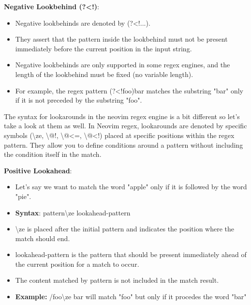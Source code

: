 \documentclass{report}
\begin{document}
    \bigbreak \noindent 
    \textbf{Negative Lookbehind (?<!)}:
    \begin{itemize}
        \item Negative lookbehinds are denoted by (?<!...).
        \item They assert that the pattern inside the lookbehind must not be present immediately before the current position in the input string.
        \item Negative lookbehinds are only supported in some regex engines, and the length of the lookbehind must be fixed (no variable length).
        \item For example, the regex pattern (?<!foo)bar matches the substring "bar" only if it is not preceded by the substring "foo".
    \end{itemize}

    \bigbreak \noindent 

    \pagebreak \bigbreak \noindent
    \bigbreak \noindent 
    The syntax for lookarounds in the neovim regex engine is a bit different so let's take a look at them as well.
    \bigbreak \noindent 
    In Neovim regex, lookarounds are denoted by specific symbols (\textbackslash ze, \textbackslash @!, \textbackslash @<=, \textbackslash @<!) placed at specific positions within the regex pattern. They allow you to define conditions around a pattern without including the condition itself in the match.  

    \bigbreak \noindent 
    \textbf{Positive Lookahead}:
    \begin{itemize}
        \item Let's say we want to match the word "apple" only if it is followed by the word "pie".
        \item \textbf{Syntax}: pattern\textbackslash ze lookahead-pattern
        \item \textbackslash ze is placed after the initial pattern and indicates the position where the match should end.
        \item lookahead-pattern is the pattern that should be present immediately ahead of the current position for a match to occur.
        \item The content matched by pattern is not included in the match result.
        \item \textbf{Example:} /foo\textbackslash ze bar will match "foo" but only if it procedes the word "bar"
    \end{itemize}
\end{document}
